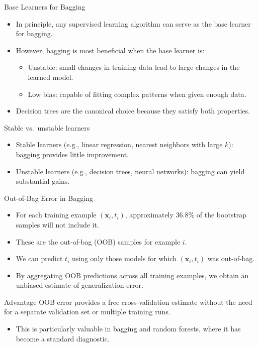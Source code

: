 \begin{frame}{Base Learners for Bagging}
  \begin{itemize}
    \item In principle, \alert{any supervised learning algorithm} can serve as the base learner
          for bagging.
    \item However, bagging is most beneficial when the base learner is:
      \begin{itemize}
        \item \alert{Unstable}: small changes in training data lead to large changes in the
              learned model.
        \item \alert{Low bias}: capable of fitting complex patterns when given enough data.
      \end{itemize}
    \item Decision trees are the canonical choice because they satisfy both properties.
  \end{itemize}
  \begin{block}{Stable vs.\ unstable learners}
    \begin{itemize}
      \item Stable learners (e.g., linear regression, nearest neighbors with large $k$):
            bagging provides little improvement.
      \item Unstable learners (e.g., decision trees, neural networks): bagging can yield
            substantial gains.
    \end{itemize}
  \end{block}
\end{frame}

\begin{frame}{Out-of-Bag Error in Bagging}
  \begin{itemize}
    \item For each training example $(\mathbf{x}_i, t_i)$, approximately $36.8\%$ of the
          bootstrap samples will not include it.
    \item These are the \alert{out-of-bag (OOB)} samples for example $i$.
    \item We can predict $t_i$ using only those models for which $(\mathbf{x}_i, t_i)$
          was out-of-bag.
    \item By aggregating OOB predictions across all training examples, we obtain an unbiased
          estimate of generalization error.
  \end{itemize}
  \begin{block}{Advantage}
    OOB error provides a \alert{free cross-validation estimate} without the need for a
    separate validation set or multiple training runs.
  \end{block}
  \begin{itemize}
    \item This is particularly valuable in bagging and random forests, where it has become
          a standard diagnostic.
  \end{itemize}
\end{frame}

